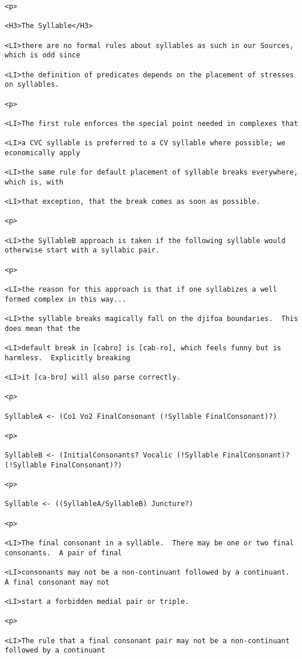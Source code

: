 \documentclass[12pt]{article}
\begin{document}
\begin{lstlisting}
<p>

<H3>The Syllable</H3>

<LI>there are no formal rules about syllables as such in our Sources, which is odd since

<LI>the definition of predicates depends on the placement of stresses on syllables.

<p>

<LI>The first rule enforces the special point needed in complexes that

<LI>a CVC syllable is preferred to a CV syllable where possible; we economically apply

<LI>the same rule for default placement of syllable breaks everywhere, which is, with

<LI>that exception, that the break comes as soon as possible.

<p>

<LI>the SyllableB approach is taken if the following syllable would otherwise start with a syllabic pair.

<p>

<LI>the reason for this approach is that if one syllabizes a well formed complex in this way...

<LI>the syllable breaks magically fall on the djifoa boundaries.  This does mean that the

<LI>default break in [cabro] is [cab-ro], which feels funny but is harmless.  Explicitly breaking

<LI>it [ca-bro] will also parse correctly.

<p>

SyllableA <- (Co1 Vo2 FinalConsonant (!Syllable FinalConsonant)?)

<p>

SyllableB <- (InitialConsonants? Vocalic (!Syllable FinalConsonant)? (!Syllable FinalConsonant)?)

<p>

Syllable <- ((SyllableA/SyllableB) Juncture?)

<p>

<LI>The final consonant in a syllable.  There may be one or two final consonants.  A pair of final

<LI>consonants may not be a non-continuant followed by a continuant.  A final consonant may not

<LI>start a forbidden medial pair or triple.

<p>

<LI>The rule that a final consonant pair may not be a non-continuant followed by a continuant


\end{lstlisting}
\end{document}

